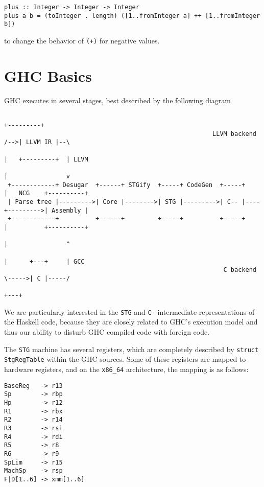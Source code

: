 \documentclass[letterpaper]{article}
\begin{document}
\begin{verbatim}
plus :: Integer -> Integer -> Integer
plus a b = (toInteger . length) ([1..fromInteger a] ++ [1..fromInteger b])
\end{verbatim}

to change the behavior of \texttt{(+)} for negative values.

\section{GHC Basics}

GHC executes in several stages, best described by the following diagram

\begin{listing}[H]
\begin{verbatim}
                                                                          +---------+
                                                         LLVM backend /-->| LLVM IR |--\
                                                                      |   +---------+  | LLVM
                                                                      |                v
 +------------+ Desugar  +------+ STGify  +-----+ CodeGen  +-----+    |   NCG    +----------+
 | Parse tree |--------->| Core |-------->| STG |--------->| C-- |----+--------->| Assembly |
 +------------+          +------+         +-----+          +-----+    |          +----------+
                                                                      |                ^
                                                                      |      +---+     | GCC
                                                            C backend \----->| C |-----/
                                                                             +---+
\end{verbatim}
\end{listing}

We are particularly interested in the \texttt{STG} and \texttt{C--} intermediate
representations of the Haskell code, because they are closely related to GHC's
execution model and thus our ability to disturb GHC compiled code with foreign
code.

The \texttt{STG} machine has several registers, which are completely described
by \texttt{struct StgRegTable} within the GHC sources. Some of these
registers are mapped to hardware registers, and on the \texttt{x86\_64}
architecture, the mapping is as follows:

\begin{verbatim}
BaseReg   -> r13
Sp        -> rbp
Hp        -> r12
R1        -> rbx
R2        -> r14
R3        -> rsi
R4        -> rdi
R5        -> r8
R6        -> r9
SpLim     -> r15
MachSp    -> rsp
F|D[1..6] -> xmm[1..6]
\end{verbatim}
\end{document}
